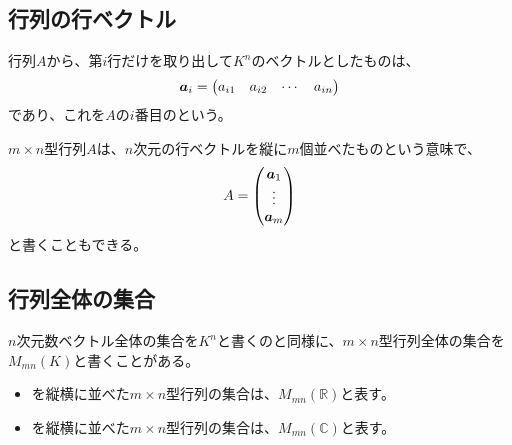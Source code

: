 \documentclass[../../../topic_linear-algebra]{subfiles}
\begin{document}
\subsection{行列の行ベクトル}

行列$A$から、第$i$行だけを取り出して$K^n$のベクトルとしたものは、
\begin{equation*}
  \vb*{a}_i = \begin{pmatrix}
    a_{i1} & a_{i2} & \cdots & a_{in}
  \end{pmatrix}
\end{equation*}
であり、これを$A$の$i$番目のという。

\br

$m \times n$型行列$A$は、$n$次元の行ベクトルを縦に$m$個並べたものという意味で、
\begin{equation*}
  A = \begin{pmatrix}
    \vb*{a}_1 \\
    \vdots \\
    \vb*{a}_m
  \end{pmatrix}
\end{equation*}
と書くこともできる。

\subsection{行列全体の集合}

$n$次元数ベクトル全体の集合を$K^n$と書くのと同様に、$m \times n$型行列全体の集合を$M_{mn}(K)$と書くことがある。

\begin{itemize}
  \item {}を縦横に並べた$m \times n$型行列の集合は、$M_{mn}(\mathbb{R})$と表す。
  \item {}を縦横に並べた$m \times n$型行列の集合は、$M_{mn}(\mathbb{C})$と表す。
\end{itemize}
\end{document}
